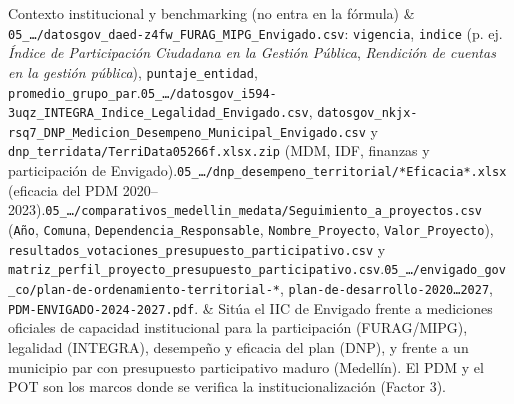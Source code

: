 \documentclass[11pt,a4paper]{article}
\begin{document}
{\begin{longtable}
Contexto institucional y benchmarking (no entra en la fórmula) & \texttt{05\_\allowbreak{}\ldots{}/\allowbreak{}datosgov\_\allowbreak{}daed-\allowbreak{}z4fw\_\allowbreak{}FURAG\_\allowbreak{}MIPG\_\allowbreak{}Envigado.\allowbreak{}csv}: \texttt{vigencia}, \texttt{indice} (p. ej. \emph{Índice de Participación Ciudadana en la Gestión Pública}, \emph{Rendición de cuentas en la gestión pública}), \texttt{puntaje\_\allowbreak{}entidad}, \texttt{promedio\_\allowbreak{}grupo\_\allowbreak{}par}.\newline \texttt{05\_\allowbreak{}\ldots{}/\allowbreak{}datosgov\_\allowbreak{}i594-\allowbreak{}3uqz\_\allowbreak{}INTEGRA\_\allowbreak{}Indice\_\allowbreak{}Legalidad\_\allowbreak{}Envigado.\allowbreak{}csv}, \texttt{datosgov\_\allowbreak{}nkjx-\allowbreak{}rsq7\_\allowbreak{}DNP\_\allowbreak{}Medicion\_\allowbreak{}Desempeno\_\allowbreak{}Municipal\_\allowbreak{}Envigado.\allowbreak{}csv} y \texttt{dnp\_\allowbreak{}terridata/\allowbreak{}TerriData05266f.\allowbreak{}xlsx.\allowbreak{}zip} (MDM, IDF, finanzas y participación de Envigado).\newline \texttt{05\_\allowbreak{}\ldots{}/\allowbreak{}dnp\_\allowbreak{}desempeno\_\allowbreak{}territorial/\allowbreak{}*Eficacia*.\allowbreak{}xlsx} (eficacia del PDM 2020–2023).\newline \texttt{05\_\allowbreak{}\ldots{}/\allowbreak{}comparativos\_\allowbreak{}medellin\_\allowbreak{}medata/\allowbreak{}Seguimiento\_\allowbreak{}a\_\allowbreak{}proyectos.\allowbreak{}csv} (\texttt{Año}, \texttt{Comuna}, \texttt{Dependencia\_\allowbreak{}Responsable}, \texttt{Nombre\_\allowbreak{}Proyecto}, \texttt{Valor\_\allowbreak{}Proyecto}), \texttt{resultados\_\allowbreak{}votaciones\_\allowbreak{}presupuesto\_\allowbreak{}participativo.\allowbreak{}csv} y \texttt{matriz\_\allowbreak{}perfil\_\allowbreak{}proyecto\_\allowbreak{}presupuesto\_\allowbreak{}participativo.\allowbreak{}csv}.\newline \texttt{05\_\allowbreak{}\ldots{}/\allowbreak{}envigado\_\allowbreak{}gov\_\allowbreak{}co/\allowbreak{}plan-\allowbreak{}de-\allowbreak{}ordenamiento-\allowbreak{}territorial-\allowbreak{}*}, \texttt{plan-\allowbreak{}de-\allowbreak{}desarrollo-\allowbreak{}2020\ldots{}2027}, \texttt{PDM-\allowbreak{}ENVIGADO-\allowbreak{}2024-\allowbreak{}2027.\allowbreak{}pdf}. & Sitúa el IIC de Envigado frente a mediciones oficiales de capacidad institucional para la participación (FURAG/MIPG), legalidad (INTEGRA), desempeño y eficacia del plan (DNP), y frente a un municipio par con presupuesto participativo maduro (Medellín). El PDM y el POT son los marcos donde se verifica la institucionalización (Factor 3). \\
\end{longtable}
}
\end{document}
